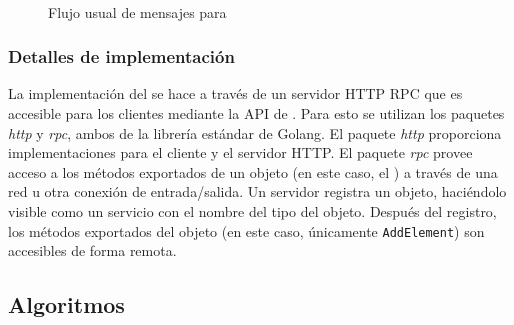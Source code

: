 \begin{figure}[h]
  \\
  \caption{Flujo usual de mensajes para \compresschain}
  \label{fig:compresschain-flow}
\end{figure}

\subsubsection{Detalles de implementación}
La implementación del \collector se hace a través de un servidor HTTP RPC que es accesible para los clientes
mediante la API de \setchain.
%
Para esto se utilizan los paquetes \textit{http} y \textit{rpc}, ambos de la librería estándar de Golang.
%
El paquete \textit{http} proporciona implementaciones para el cliente y el servidor HTTP.
%
El paquete \textit{rpc} provee acceso a los métodos exportados de un objeto (en este caso, el \collector)
a través de una red u otra conexión de entrada/salida.
%
Un servidor registra un objeto, haciéndolo visible como un servicio con el nombre del tipo del objeto.
%
Después del registro, los métodos exportados del objeto (en este caso, únicamente \texttt{AddElement}) son accesibles de forma remota.


\subsection{Algoritmos}\label{subsec:compresschain-algorithms}
%
%

